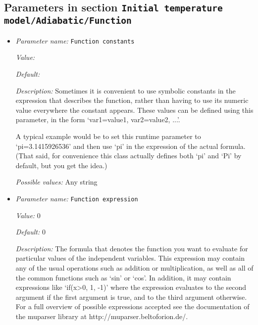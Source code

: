 \subsection{Parameters in section \tt Initial temperature model/Adiabatic/Function}
\label{parameters:Initial_20temperature_20model/Adiabatic/Function}

\begin{itemize}
\item {\it Parameter name:} {\tt Function constants}
\label{parameters:Initial temperature model/Adiabatic/Function/Function constants}


{\it Value:} 


{\it Default:} 


{\it Description:} Sometimes it is convenient to use symbolic constants in the expression that describes the function, rather than having to use its numeric value everywhere the constant appears. These values can be defined using this parameter, in the form `var1=value1, var2=value2, ...'.

A typical example would be to set this runtime parameter to `pi=3.1415926536' and then use `pi' in the expression of the actual formula. (That said, for convenience this class actually defines both `pi' and `Pi' by default, but you get the idea.)


{\it Possible values:} Any string
\item {\it Parameter name:} {\tt Function expression}
\label{parameters:Initial temperature model/Adiabatic/Function/Function expression}


{\it Value:} 0


{\it Default:} 0


{\it Description:} The formula that denotes the function you want to evaluate for particular values of the independent variables. This expression may contain any of the usual operations such as addition or multiplication, as well as all of the common functions such as `sin' or `cos'. In addition, it may contain expressions like `if(x>0, 1, -1)' where the expression evaluates to the second argument if the first argument is true, and to the third argument otherwise. For a full overview of possible expressions accepted see the documentation of the muparser library at http://muparser.beltoforion.de/.


\end{itemize}
